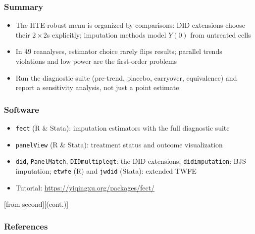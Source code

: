 \documentclass[xcolor=svgnames,9pt,english, aspectratio=169]{beamer}
\begin{document}
\begin{frame}[t]
  \frametitle{Summary}
\begin{itemize}[<+->]\itemsep1.1em
\item The HTE-robust menu is organized by comparisons: DID extensions choose their $2\times 2$s explicitly; imputation methods model $Y(0)$ from untreated cells
\item In 49 reanalyses, estimator choice rarely flips results; parallel trends violations and \alert{low power} are the first-order problems
\item Run the diagnostic suite (pre-trend, placebo, carryover, equivalence) and report a sensitivity analysis, not just a point estimate
\end{itemize}
\end{frame}

\begin{frame}[t]
  \frametitle{Software}
\begin{itemize}\itemsep0.5em
\item \texttt{fect} (R \& Stata): imputation estimators with the full diagnostic suite
\item \texttt{panelView} (R \& Stata): treatment status and outcome visualization
\item \texttt{did}, \texttt{PanelMatch}, \texttt{DIDmultiplegt}: the DID extensions; \texttt{didimputation}: BJS imputation; \texttt{etwfe} (R) and \texttt{jwdid} (Stata): extended TWFE
\item Tutorial: \url{https://yiqingxu.org/packages/fect/}
\end{itemize}
\end{frame}

\appendix

[from second][(cont.)]
\begin{frame}[t,allowframebreaks=1.0]
  \frametitle{References}
\end{frame}
\end{document}
